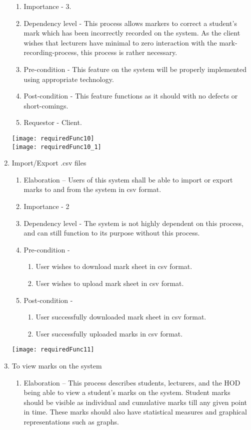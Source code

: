 \documentclass[12pt, a4paper]{scrartcl}
\begin{document}
\begin{enumerate}
\begin{enumerate}
						\item Importance - 3.
						\item Dependency level - This process allows markers to correct a student’s mark which has been incorrectly recorded on the system. As the client wishes that lecturers have minimal to zero interaction with the mark-recording-process, this process is rather necessary.
						\item Pre-condition - This feature on the system will be properly implemented using appropriate technology.
						\item Post-condition - This feature functions as it should with no defects or short-comings.
						\item Requestor - Client.
					\end{enumerate}
					\texttt{[image: requiredFunc10]}\\
					\texttt{[image: requiredFunc10\_1]}
					\item Import/Export .csv files
					\begin{enumerate}
						\item Elaboration – Users of this system shall be able to import or export marks to and from the system in csv format.
						\item Importance - 2
						\item Dependency level - The system is not highly dependent on this process, and can still function to its purpose without this process.
						\item Pre-condition - 
						\begin{enumerate}
							\item User wishes to download mark sheet in csv format.
							\item User wishes to upload mark sheet in csv format.
						\end{enumerate}
						\item Post-condition -
						\begin{enumerate}
							\item User successfully downloaded mark sheet in csv format.
							\item User successfully uploaded marks in csv format.
						\end{enumerate}
					\end{enumerate}
					\texttt{[image: requiredFunc11]}
					\item To view marks on the system
					\begin{enumerate}
					\item Elaboration – This process describes students, lecturers, and the HOD being able to view a student’s marks on the system. Student marks should be visible as individual and cumulative marks till any given point in time. These marks should also have statistical measures and graphical representations such as graphs.

\end{enumerate}
\end{enumerate}
\end{document}
